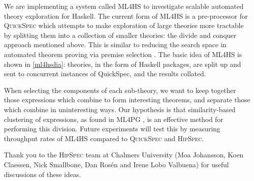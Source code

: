 \documentclass{eceasst}
\begin{document}
We are implementing a system called \textsc{ML4HS} to investigate scalable
automated theory exploration for Haskell. The current form of \textsc{ML4HS} is
a pre-processor for \textsc{QuickSpec} which attempts to make exploration of
large theories more tractable by splitting them into a collection of smaller
theories: the divide and conquer approach mentioned above. This is
similar to reducing the search space in automated theorem proving via premise
selection \cite{kuhlwein2012overview}. The basic idea of \textsc{ML4HS} is shown
in \autoref{ml4hsdia}: theories, in the form of Haskell packages, are split up
and sent to concurrent instances of QuickSpec, and the results collated.

When selecting the components of each sub-theory, we want to keep together those
expressions which combine to form interesting theorems, and separate those which
combine in uninteresting ways. Our hypothesis is that similarity-based
clustering of expressions, as found in \textsc{ML4PG}
\cite{journals/corr/abs-1302-6421}, is an effective method for performing this
division. Future experiments will test this by measuring throughput rates of
\textsc{ML4HS} compared to \textsc{QuickSpec} and \textsc{HipSpec}.

\begin{acknowledge}
Thank you to the \textsc{HipSpec} team at Chalmers University (Moa Johansson,
Koen Claessen, Nick Smallbone, Dan Ros{\'e}n and Irene Lobo Valbuena) for useful
discussions of these ideas.
\end{acknowledge}



\end{document}
